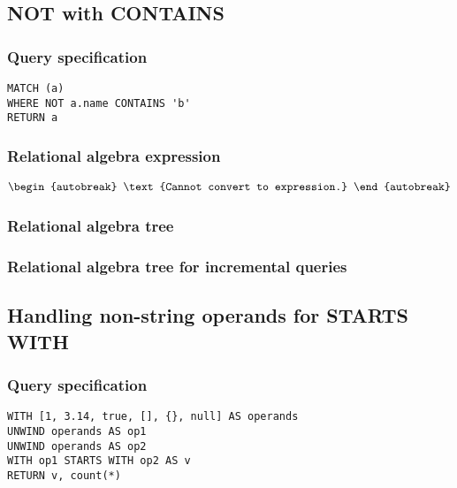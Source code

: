 
\subsection{NOT with CONTAINS}

\subsubsection*{Query specification}

\begin{lstlisting}
MATCH (a)
WHERE NOT a.name CONTAINS 'b'
RETURN a
\end{lstlisting}

\subsubsection*{Relational algebra expression}

\begin{align*}
\begin{autobreak}
\text{Cannot convert to expression.}
\end{autobreak}
\end{align*}

\subsubsection*{Relational algebra tree}


\subsubsection*{Relational algebra tree for incremental queries}


\subsection{Handling non-string operands for STARTS WITH}

\subsubsection*{Query specification}

\begin{lstlisting}
WITH [1, 3.14, true, [], {}, null] AS operands
UNWIND operands AS op1
UNWIND operands AS op2
WITH op1 STARTS WITH op2 AS v
RETURN v, count(*)
\end{lstlisting}

